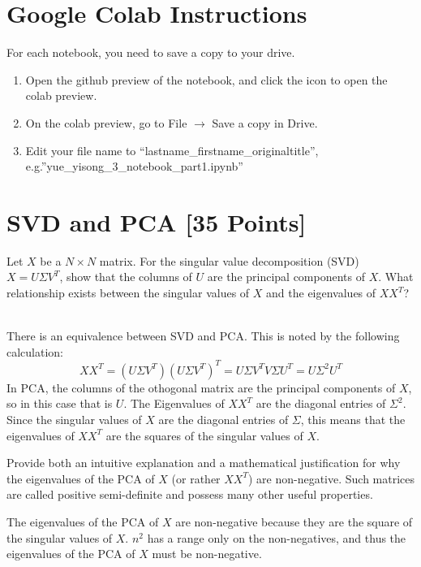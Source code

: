 \section*{Google Colab Instructions}

For each notebook, you need to save a copy to your drive.

\begin{enumerate}
	\item Open the github preview of the notebook, and click the icon to open the colab preview.
	\item On the colab preview, go to File $\rightarrow$ Save a copy in Drive.
	\item Edit your file name to “lastname_firstname_originaltitle”, e.g.”yue_yisong_3_notebook_part1.ipynb”
\end{enumerate}



\newpage
\section{SVD and PCA [35 Points]}

\problem[3] Let $X$ be a $N \times N$ matrix. For the singular value decomposition (SVD) $X = U \Sigma V^T$, show that the columns of $U$ are the principal components of $X$. What relationship exists between the singular values of $X$ and the eigenvalues of $XX^T$?

\begin{solution}
	\\ There is an equivalence between SVD and PCA. This is noted by the following calculation: 
	$$ XX^T = (U \Sigma V^T)(U \Sigma V^T)^T = U \Sigma V^T V \Sigma U^T = U \Sigma^2 U^T $$
	In PCA, the columns of the othogonal matrix are the principal components of $X$, so in this case that is $U$. The Eigenvalues of $XX^T$ are the diagonal entries of $\Sigma^2$. Since the singular values of $X$ are the diagonal entries of $\Sigma$, this means that the eigenvalues of $XX^T$ are the squares of the singular values of $X$.
\end{solution}

\problem[4] Provide both an intuitive explanation and a mathematical justification for why the eigenvalues of the PCA of $X$ (or rather $XX^T$) are non-negative. Such matrices are called positive semi-definite and possess many other useful properties.

\begin{solution}
	The eigenvalues of the PCA of $X$ are non-negative because they are the square of the singular values of $X$. $n^2$ has a range only on the non-negatives, and thus the eigenvalues of the PCA of $X$ must be non-negative.  
\end{solution}


